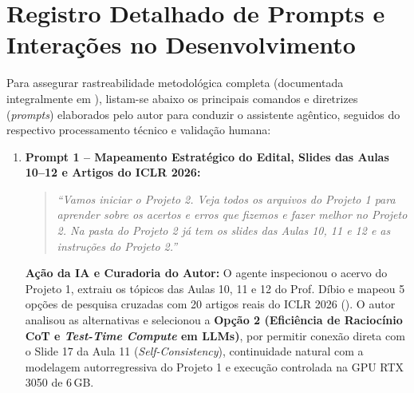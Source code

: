 \documentclass[9pt,a4paper]{extarticle}
\begin{document}
\section{Registro Detalhado de Prompts e Intera\c{c}\~{o}es no Desenvolvimento}

Para assegurar rastreabilidade metodol\'{o}gica completa (documentada integralmente em ), listam-se abaixo os principais comandos e diretrizes (\textit{prompts}) elaborados pelo autor para conduzir o assistente ag\^{e}ntico, seguidos do respectivo processamento t\'{e}cnico e valida\c{c}\~{a}o humana:

\begin{enumerate}[leftmargin=1.4em, itemsep=2pt, topsep=1pt]
    \item \textbf{Prompt 1 -- Mapeamento Estrat\'{e}gico do Edital, Slides das Aulas 10--12 e Artigos do ICLR 2026:}
    \begin{quote}
    \textit{``Vamos iniciar o Projeto 2. Veja todos os arquivos do Projeto 1 para aprender sobre os acertos e erros que fizemos e fazer melhor no Projeto 2. Na pasta do Projeto 2 já tem os slides das Aulas 10, 11 e 12 e as instruções do Projeto 2.''}
    \end{quote}
    \textbf{A\c{c}\~{a}o da IA e Curadoria do Autor:} O agente inspecionou o acervo do Projeto 1, extraiu os t\'{o}picos das Aulas 10, 11 e 12 do Prof. D\'{i}bio e mapeou 5 op\c{c}\~{o}es de pesquisa cruzadas com 20 artigos reais do ICLR 2026 (). O autor analisou as alternativas e selecionou a \textbf{Op\c{c}\~{a}o 2 (Efici\^{e}ncia de Racioc\'{i}nio CoT e \textit{Test-Time Compute} em LLMs)}, por permitir conex\~{a}o direta com o Slide 17 da Aula 11 (\textit{Self-Consistency}), continuidade natural com a modelagem autorregressiva do Projeto 1 e execu\c{c}\~{a}o controlada na GPU RTX 3050 de 6\,GB.


\end{enumerate}
\end{document}
